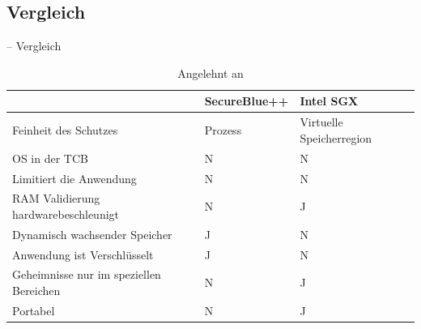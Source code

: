 \documentclass[fleqn,11pt,aspectratio=43,table]{beamer}
\newlength\foo
\begin{document}
\subsection{Vergleich}
\begin{frame}{\insertsectionhead -- Vergleich}
	\begin{table}
		\centering
		\small
		\begin{tabular}{|p{5cm}|p{2.5cm}|p{2.5cm}|} \hline
			& SecureBlue++ & Intel SGX \cite{mckeen2013innovative} \\
			\hline 
			
			 Feinheit des Schutzes& \cellcolor{red!25}Prozess & \cellcolor{green!25}Virtuelle Speicherregion \\\hline
			 OS in der TCB& 	\cellcolor{green!25}N& 	\cellcolor{green!25}N \\\hline
			 Limitiert die Anwendung& 	\cellcolor{green!25}N& \cellcolor{green!25}N \\\hline
			 RAM Validierung hardwarebeschleunigt & \cellcolor{red!25}N& \cellcolor{green!25}J \\\hline
			 Dynamisch wachsender Speicher& \cellcolor{green!25}J & \cellcolor{red!25}N \\\hline
			 Anwendung ist Verschlüsselt& \cellcolor{yellow!25}J& \cellcolor{yellow!25}N \\\hline
			 Geheimnisse nur im speziellen Bereichen & \cellcolor{green!25}N  & \cellcolor{red!25}J\\\hline
			 Portabel & \cellcolor{red!25}N  & \cellcolor{green!25}J\\\hline
		\end{tabular}
		\caption*{\footnotesize Angelehnt an \cite{evtyushkin2014iso}}
	\end{table}
\end{frame}
\end{document}
